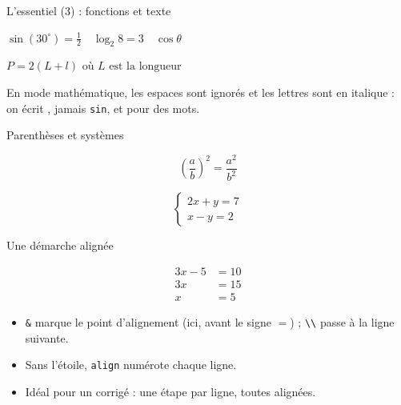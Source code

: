 \begin{frame}[fragile]{L'essentiel (3) : fonctions et texte}
\begin{CodeRendu}[title={Fonctions : droites et bien espacées}]
$\sin(30^\circ) = \frac12
 \quad \log_2 8 = 3 \quad \cos \theta$
\end{CodeRendu}
\begin{CodeRendu}[title={Du texte dans une formule}]
$P = 2(L + l) \text{ où } L
 \text{ est la longueur}$
\end{CodeRendu}
  \small En mode mathématique, les espaces sont ignorés et les lettres
  sont en italique : on écrit , jamais \texttt{sin}, et
   pour des mots.
\end{frame}

\begin{frame}[fragile]{Parenthèses et systèmes}
\begin{CodeRendu}[title={Parenthèses qui s'ajustent}]
\[ \left( \frac{a}{b} \right)^2
   = \frac{a^2}{b^2} \]
\end{CodeRendu}
\begin{CodeRendu}[title={Un système d'équations}]
\[ \begin{cases}
     2x + y = 7 \\
     x - y = 2
   \end{cases} \]
\end{CodeRendu}
\end{frame}

\begin{frame}[fragile]{Une démarche alignée}
\begin{CodeRendu}[title={L'environnement align*}]
\begin{align*}
  3x - 5 &= 10 \\
  3x &= 15 \\
  x &= 5
\end{align*}
\end{CodeRendu}
  \small
  \begin{itemize}
    \item \texttt{\&} marque le point d'alignement (ici, avant le signe
      $=$) ; \texttt{\textbackslash\textbackslash} passe à la ligne suivante.
    \item Sans l'étoile, \texttt{align} numérote chaque ligne.
    \item Idéal pour un corrigé : une étape par ligne, toutes alignées.
  \end{itemize}
\end{frame}

